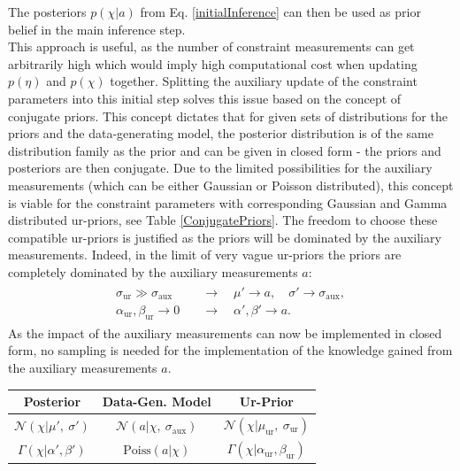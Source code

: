 \noindent The posteriors $p(\chi \vert a)$ from Eq. \eqref{initialInference} can then be used as prior belief in the main inference step. \\
This approach is useful, as the number of constraint measurements can get arbitrarily high which would imply high computational cost when updating $p(\eta)$ and $p(\chi)$ together. Splitting the auxiliary update of the constraint parameters into this initial step solves this issue based on the concept of conjugate priors. This concept dictates that for given sets of distributions for the priors and the data-generating model, the posterior distribution is of the same distribution family as the prior and can be given in closed form - the priors and posteriors are then conjugate. Due to the limited possibilities for the auxiliary measurements (which can be either Gaussian or Poisson distributed), this concept is viable for the constraint parameters with corresponding Gaussian and Gamma distributed ur-priors, see Table \ref{ConjugatePriors}\cite{ConjPriorsBerkeley}. The freedom to choose these compatible ur-priors is justified as the priors will be dominated by the auxiliary measurements. Indeed, in the limit of very vague ur-priors the priors are completely dominated by the auxiliary measurements $a$:
    \begin{align}
    \begin{split}
        \sigma_{\text{ur}} \gg \sigma_{\text{aux}} \quad &\longrightarrow \quad  \mu' \rightarrow a, \quad \sigma' \rightarrow \sigma_{\text{aux}}, \\
        \alpha_{\text{ur}}, \beta_{\text{ur}} \rightarrow 0 \quad &\longrightarrow \quad \alpha', \beta' \rightarrow a.
    \end{split}
    \end{align}
As the impact of the auxiliary measurements can now be implemented in closed form, no sampling is needed for the implementation of the knowledge gained from the auxiliary measurements $a$.

    \begin{center}
        \begin{tabular} 
        {| c || c | c|} 
         \hline
          Posterior & Data-Gen. Model & Ur-Prior \\
         \hline
         \hline
         $\mathcal{N}\left( \chi | \mu',~\sigma'\right)$ &$ \mathcal{N}\left( a | \chi,~\sigma_{\text{aux}}\right)$ & $\mathcal{N}\left( \chi | \mu_{\text{ur}},~\sigma_{\text{ur}}\right)$ \\
        \hline
        $\Gamma\left(\chi |\alpha', \beta'\right)$ & $\text{Poiss}\left( a | \chi \right)$ & $\Gamma\left(\chi |\alpha_{\text{ur}}, \beta_{\text{ur}} \right)$ \\
        \hline
        \end{tabular}
    \end{center} 

